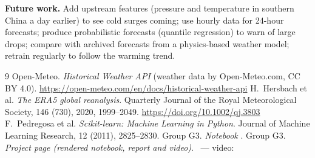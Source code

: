 \textbf{Future work.} Add upstream features (pressure and temperature in southern China a day earlier) to see cold surges
coming; use hourly data for 24-hour forecasts; produce probabilistic forecasts (quantile regression) to warn of large drops;
compare with archived forecasts from a physics-based weather model; retrain regularly to follow the warming trend.

\begin{thebibliography}{9}
 Open-Meteo. \emph{Historical Weather API} (weather data by Open-Meteo.com, CC BY 4.0).
  \url{https://open-meteo.com/en/docs/historical-weather-api}
 H.~Hersbach et al. \emph{The ERA5 global reanalysis}. Quarterly Journal of the Royal Meteorological Society,
  146 (730), 2020, 1999--2049. \url{https://doi.org/10.1002/qj.3803}
 F.~Pedregosa et al. \emph{Scikit-learn: Machine Learning in Python}. Journal of Machine Learning
  Research, 12 (2011), 2825--2830.
 Group G3. \emph{Notebook} . \TSNotebook
{} Group G3. \emph{Project page (rendered notebook, report and video)}. \TSPage\ — video: \TSVideo
\end{thebibliography}
